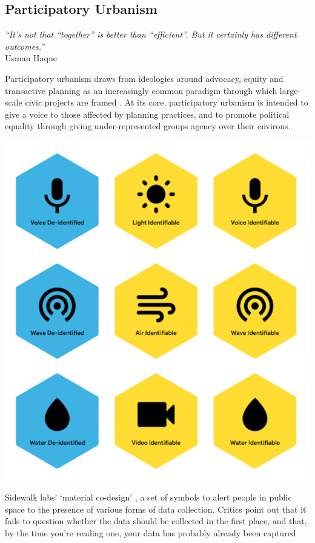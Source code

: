 \documentclass[nofonts,nols,justified,nobib]{tufte-book}
\begin{document}
\subsection*{Participatory Urbanism}

\begin{flushright}
\emph{ ``It's not that ``together'' is better than ``efficient''. But it certainly has different outcomes.''} \cite{haque_notes_2008}\\
Usman Haque
\end{flushright}

Participatory urbanism draws from ideologies around advocacy, equity and transactive planning as an increasingly common paradigm through which large-scale civic projects are framed \cite{krivy_participatory_2013}. At its core, participatory urbanism is intended to give a voice to those affected by planning practices, and to promote political equality through giving under-represented groups agency over their environs. 

\begin{marginfigure}
\includegraphics[width=\textwidth]{img/1/sidewalk-symbols.png}
\caption{Sidewalk labs' `material co-design' \cite{lu_how_2019}, a set of symbols to alert people in public space to the presence of various forms of data collection. Critics point out that it fails to question whether the data should be collected in the first place, and that, by the time you're reading one, your data has probably already been captured \cite{mattern_sidewalk_2019}}
\end{marginfigure}
\end{document}
